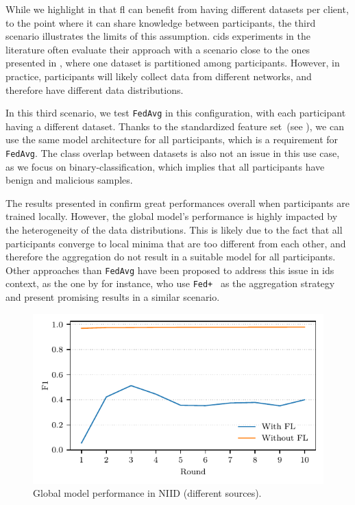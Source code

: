 While we highlight in  that \gls{fl} can benefit from having different datasets per client, to the point where it can share knowledge between participants, the third scenario illustrates the limits of this assumption.
\Gls{cids} experiments in the literature often evaluate their approach with a scenario close to the ones presented in , where one dataset is partitioned among participants.
However, in practice, participants will likely collect data from different networks, and therefore have different data distributions.

In this third scenario, we test \texttt{FedAvg} in this configuration, with each participant having a different dataset.
Thanks to the standardized feature set~(see ), we can use the same model architecture for all participants, which is a requirement for \texttt{FedAvg}.
The class overlap between datasets is also not an issue in this use case, as we focus on binary-classification, which implies that all participants have benign and malicious samples.

The results presented in  confirm great performances overall when participants are trained locally. 
However, the global model's performance is highly impacted by the heterogeneity of the data distributions.
This is likely due to the fact that all participants converge to local minima that are too different from each other, and therefore the aggregation do not result in a suitable model for all participants.
Other approaches than \texttt{FedAvg} have been proposed to address this issue in \gls{ids} context, as the one by \textcite{popoola_FederatedDeepLearning_2021} for instance, who use \texttt{Fed+}~\cite{kundu_RobustnessPersonalizationFederated_2022a} as the aggregation strategy and present promising results in a similar scenario.

\begin{figure}
    \centering
    \includegraphics{figures/heterogeneous.pdf}
    \caption{Global model performance in NIID (different sources).}
    \label{fig:heterogeneous}
\end{figure}


